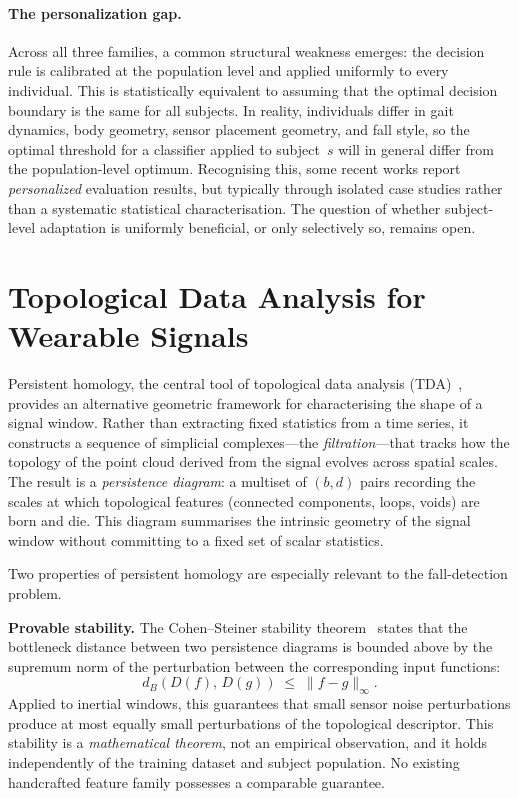 \paragraph{The personalization gap.}
Across all three families, a common structural weakness emerges: the decision rule is
calibrated at the population level and applied uniformly to every individual.  This
is statistically equivalent to assuming that the optimal decision boundary is the
same for all subjects.  In reality, individuals differ in gait dynamics, body geometry,
sensor placement geometry, and fall style, so the optimal threshold for a classifier
applied to subject~$s$ will in general differ from the population-level optimum.
Recognising this, some recent works report \emph{personalized} evaluation results, but
typically through isolated case studies rather than a systematic statistical
characterisation.  The question of whether subject-level adaptation is uniformly
beneficial, or only selectively so, remains open.

\section{Topological Data Analysis for Wearable Signals}
\label{subsec:tda-motivation}

Persistent homology, the central tool of topological data analysis
(TDA)~\parencite{edelsbrunner2010computational, carlsson2009topology}, provides an
alternative geometric framework for characterising the shape of a signal window.
Rather than extracting fixed statistics from a time series, it constructs a sequence
of simplicial complexes---the \emph{filtration}---that tracks how the topology of the
point cloud derived from the signal evolves across spatial scales.  The result is a
\emph{persistence diagram}: a multiset of $(b, d)$ pairs recording the scales at
which topological features (connected components, loops, voids) are born and die.
This diagram summarises the intrinsic geometry of the signal window without
committing to a fixed set of scalar statistics.

Two properties of persistent homology are especially relevant to the fall-detection
problem.

\textbf{Provable stability.}  The Cohen--Steiner stability theorem~\parencite{cohen2007stability}
states that the bottleneck distance between two persistence diagrams is bounded above
by the supremum norm of the perturbation between the corresponding input functions:
\[
  d_B(D(f),\,D(g)) \;\leq\; \|f - g\|_\infty.
\]
Applied to inertial windows, this guarantees that small sensor noise perturbations
produce at most equally small perturbations of the topological descriptor.  This
stability is a \emph{mathematical theorem}, not an empirical observation, and it holds
independently of the training dataset and subject population.  No existing handcrafted
feature family possesses a comparable guarantee.

